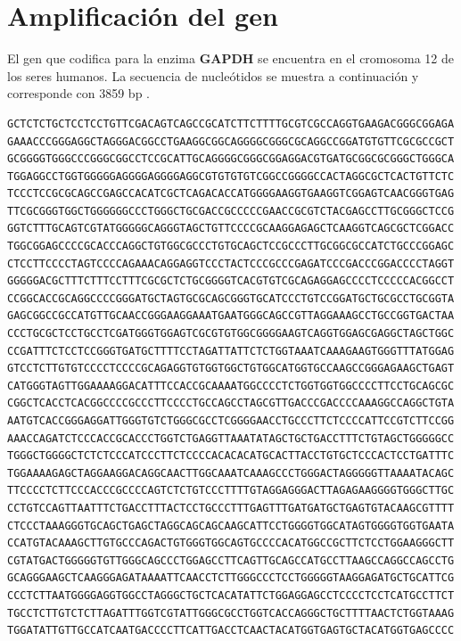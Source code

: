 \documentclass[12pt]{article}
\newcommand{\enzima}{\textbf{GAPDH}}
\begin{document}
	\section{Amplificaci\'on del gen}
		El gen que codifica para la enzima \enzima{} se encuentra en el cromosoma 12 de los seres humanos. La secuencia de nucle\'otidos se muestra a continuaci\'on y corresponde con 3859 bp \cite{NCBI}.
		\begin{Verbatim}[commandchars=\\\{\}]
GCTCTCTGCTCCTCCTGTTCGACAGTCAGCCGCATCTTCTTTTGCGTCGCCAGGTGAAGACGGGCGGAGA
GAAACCCGGGAGGCTAGGGACGGCCTGAAGGCGGCAGGGGCGGGCGCAGGCCGGATGTGTTCGCGCCGCT
GCGGGGTGGGCCCGGGCGGCCTCCGCATTGCAGGGGCGGGCGGAGGACGTGATGCGGCGCGGGCTGGGCA
TGGAGGCCTGGTGGGGGAGGGGAGGGGAGGCGTGTGTGTCGGCCGGGGCCACTAGGCGCTCACTGTTCTC
TCCCTCCGCGCAGCCGAGCCACATCGCTCAGACACCATGGGGAAGGTGAAGGTCGGAGTCAACGGGTGAG
TTCGCGGGTGGCTGGGGGGCCCTGGGCTGCGACCGCCCCCGAACCGCGTCTACGAGCCTTGCGGGCTCCG
GGTCTTTGCAGTCGTATGGGGGCAGGGTAGCTGTTCCCCGCAAGGAGAGCTCAAGGTCAGCGCTCGGACC
TGGCGGAGCCCCGCACCCAGGCTGTGGCGCCCTGTGCAGCTCCGCCCTTGCGGCGCCATCTGCCCGGAGC
CTCCTTCCCCTAGTCCCCAGAAACAGGAGGTCCCTACTCCCGCCCGAGATCCCGACCCGGACCCCTAGGT
GGGGGACGCTTTCTTTCCTTTCGCGCTCTGCGGGGTCACGTGTCGCAGAGGAGCCCCTCCCCCACGGCCT
CCGGCACCGCAGGCCCCGGGATGCTAGTGCGCAGCGGGTGCATCCCTGTCCGGATGCTGCGCCTGCGGTA
GAGCGGCCGCCATGTTGCAACCGGGAAGGAAATGAATGGGCAGCCGTTAGGAAAGCCTGCCGGTGACTAA
CCCTGCGCTCCTGCCTCGATGGGTGGAGTCGCGTGTGGCGGGGAAGTCAGGTGGAGCGAGGCTAGCTGGC
CCGATTTCTCCTCCGGGTGATGCTTTTCCTAGATTATTCTCTGGTAAATCAAAGAAGTGGGTTTATGGAG
GTCCTCTTGTGTCCCCTCCCCGCAGAGGTGTGGTGGCTGTGGCATGGTGCCAAGCCGGGAGAAGCTGAGT
CATGGGTAGTTGGAAAAGGACATTTCCACCGCAAAATGGCCCCTCTGGTGGTGGCCCCTTCCTGCAGCGC
CGGCTCACCTCACGGCCCCGCCCTTCCCCTGCCAGCCTAGCGTTGACCCGACCCCAAAGGCCAGGCTGTA
AATGTCACCGGGAGGATTGGGTGTCTGGGCGCCTCGGGGAACCTGCCCTTCTCCCCATTCCGTCTTCCGG
AAACCAGATCTCCCACCGCACCCTGGTCTGAGGTTAAATATAGCTGCTGACCTTTCTGTAGCTGGGGGCC
TGGGCTGGGGCTCTCTCCCATCCCTTCTCCCCACACACATGCACTTACCTGTGCTCCCACTCCTGATTTC
TGGAAAAGAGCTAGGAAGGACAGGCAACTTGGCAAATCAAAGCCCTGGGACTAGGGGGTTAAAATACAGC
TTCCCCTCTTCCCACCCGCCCCAGTCTCTGTCCCTTTTGTAGGAGGGACTTAGAGAAGGGGTGGGCTTGC
CCTGTCCAGTTAATTTCTGACCTTTACTCCTGCCCTTTGAGTTTGATGATGCTGAGTGTACAAGCGTTTT
CTCCCTAAAGGGTGCAGCTGAGCTAGGCAGCAGCAAGCATTCCTGGGGTGGCATAGTGGGGTGGTGAATA
CCATGTACAAAGCTTGTGCCCAGACTGTGGGTGGCAGTGCCCCACATGGCCGCTTCTCCTGGAAGGGCTT
CGTATGACTGGGGGTGTTGGGCAGCCCTGGAGCCTTCAGTTGCAGCCATGCCTTAAGCCAGGCCAGCCTG
GCAGGGAAGCTCAAGGGAGATAAAATTCAACCTCTTGGGCCCTCCTGGGGGTAAGGAGATGCTGCATTCG
CCCTCTTAATGGGGAGGTGGCCTAGGGCTGCTCACATATTCTGGAGGAGCCTCCCCTCCTCATGCCTTCT
TGCCTCTTGTCTCTTAGATTTGGTCGTATTGGGCGCCTGGTCACCAGGGCTGCTTTTAACTCTGGTAAAG
TGGATATTGTTGCCATCAATGACCCCTTCATTGACCTCAACTACATGGTGAGTGCTACATGGTGAGCCCC

\end{Verbatim}
\end{document}
